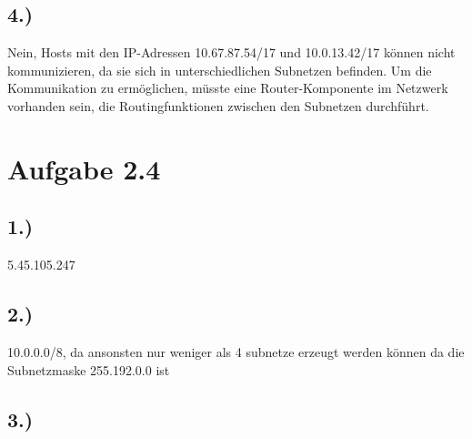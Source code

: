 \documentclass[a4paper]{scrartcl}
\begin{document}
\subsection*{4.)}
Nein, Hosts mit den IP-Adressen 10.67.87.54/17 und 10.0.13.42/17 können nicht kommunizieren, da sie sich in unterschiedlichen Subnetzen befinden. Um die Kommunikation zu ermöglichen, müsste eine Router-Komponente im Netzwerk vorhanden sein, die Routingfunktionen zwischen den Subnetzen durchführt.

\section*{Aufgabe 2.4}
\subsection*{1.)}
5.45.105.247
\subsection*{2.)}
10.0.0.0/8, da ansonsten nur weniger als 4 subnetze erzeugt werden können da die Subnetzmaske 255.192.0.0 ist
\subsection*{3.)}
\end{document}
